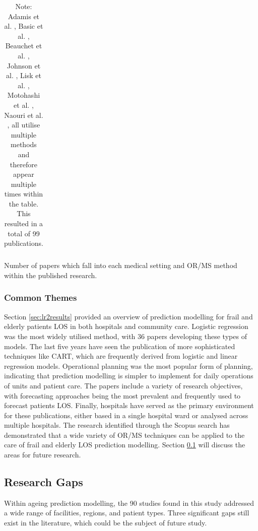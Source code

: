 \documentclass[../thesis.tex]{subfiles}
\begin{document}
\begin{landscape}
\begin{table}
{\begin{tabular}{cp{8.5cm}ccp{8.5cm}|c}
        \end{tabular}}
        \caption{Number of papers which fall into each medical setting and OR/MS method within the published research.}
        \label{tab:lr2methodsetting}
        \caption*{Note: Adamis et al. \cite{Adamis2017}, Basic et al. \cite{Basic2014}, Beauchet et al. \cite{Beauchet2018}, Johnson et al. \cite{Johnson2011}, Lisk et al. \cite{Lisk2018}, Motohashi et al. \cite{Motohashi2013}, Naouri et al. \cite{Naouri2022}, all utilise multiple methods and therefore appear multiple times within the table. This resulted in a total of 99 publications.}
    \end{table}
\end{landscape}

\subsubsection{Common Themes}
Section \ref{sec:lr2results} provided an overview of prediction modelling for frail and elderly patients LOS in both hospitals and community care. Logistic regression was the most widely utilised method, with 36 papers developing these types of models. The last five years have seen the publication of more sophisticated techniques like CART, which are frequently derived from logistic and linear regression models. Operational planning was the most popular form of planning, indicating that prediction modelling is simpler to implement for daily operations of units and patient care. The papers include a variety of research objectives, with forecasting approaches being the most prevalent and frequently used to forecast patients LOS. Finally, hospitals have served as the primary environment for these publications, either based in a single hospital ward or analysed across multiple hospitals. The research identified through the Scopus search has demonstrated that a wide variety of OR/MS techniques can be applied to the care of frail and elderly LOS prediction modelling. Section \ref{sec:lr2researchgaps} will discuss the areas for future research.

\subsection{Research Gaps}\label{sec:lr2researchgaps}
Within ageing prediction modelling, the 90 studies found in this study addressed a wide range of facilities, regions, and patient types. Three significant gaps still exist in the literature, which could be the subject of future study.
\end{document}
